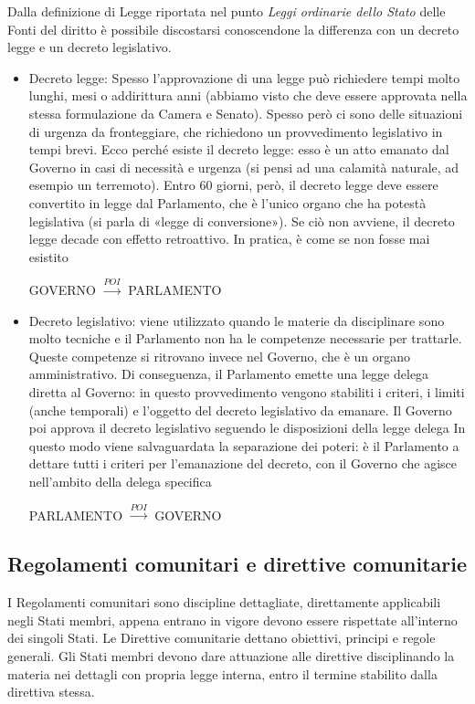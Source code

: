 Dalla definizione di Legge riportata nel punto \emph{Leggi ordinarie dello Stato} delle Fonti 
del diritto è possibile discostarsi conoscendone la differenza con un decreto legge e un decreto
legislativo.
\begin{itemize}
    \item Decreto legge: Spesso l'approvazione di una legge può richiedere tempi molto lunghi, mesi
        o addirittura anni (abbiamo visto che deve essere approvata nella stessa formulazione da Camera
        e Senato). Spesso però ci sono delle situazioni di urgenza da fronteggiare, che richiedono un 
        provvedimento legislativo in tempi brevi. Ecco perché esiste il decreto legge: esso è un atto
        emanato dal Governo in casi di necessità e urgenza (si pensi ad una calamità naturale, ad esempio 
        un terremoto). Entro 60 giorni, però, il decreto legge deve essere convertito in legge dal Parlamento, 
        che è l'unico organo che ha potestà legislativa (si parla di «legge di conversione»). Se ciò non 
        avviene, il decreto legge decade con effetto retroattivo. In pratica, è come se non fosse mai esistito
        \begin{center}
            GOVERNO $\xrightarrow{POI}$ PARLAMENTO
        \end{center}
    \item Decreto legislativo: viene utilizzato quando le materie da disciplinare sono molto tecniche e il 
        Parlamento non ha le competenze necessarie per trattarle. Queste competenze si ritrovano invece nel Governo, 
        che è un organo amministrativo. \newline
        Di conseguenza, il Parlamento emette una legge delega diretta al Governo: in questo provvedimento vengono 
        stabiliti i criteri, i limiti (anche temporali) e l'oggetto del decreto legislativo da emanare. Il Governo poi 
        approva il decreto legislativo seguendo le disposizioni della legge delega
        In questo modo viene salvaguardata la separazione dei poteri: è il Parlamento a dettare tutti i criteri per l'emanazione
        del decreto, con il Governo che agisce nell'ambito della delega specifica
        \begin{center}
            PARLAMENTO $\xrightarrow{POI}$ GOVERNO
        \end{center}
\end{itemize}

\subsection{Regolamenti comunitari e direttive comunitarie}
I Regolamenti comunitari sono discipline dettagliate, direttamente applicabili negli Stati membri, appena
entrano in vigore devono essere rispettate all'interno dei singoli Stati. \newline
Le Direttive comunitarie dettano obiettivi, principi e regole generali. Gli Stati membri devono dare attuazione
alle direttive disciplinando la materia nei dettagli con propria legge interna, entro il termine stabilito dalla
direttiva stessa.
